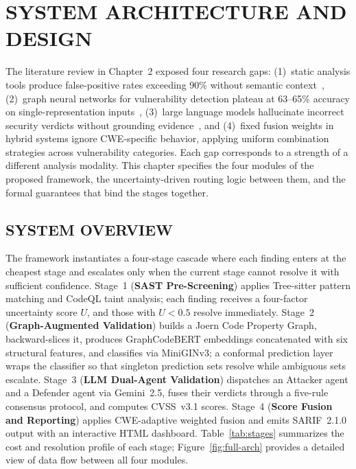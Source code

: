 \chapter{\uppercase{System Architecture and Design}}


The literature review in Chapter~2 exposed four research gaps: (1)~static analysis tools produce false-positive rates exceeding 90\% without semantic context~\cite{ghostsecurity2025}, (2)~graph neural networks for vulnerability detection plateau at 63--65\% accuracy on single-representation inputs~\cite{devign2019}, (3)~large language models hallucinate incorrect security verdicts without grounding evidence~\cite{primevul2024}, and (4)~fixed fusion weights in hybrid systems ignore CWE-specific behavior, applying uniform combination strategies across vulnerability categories. Each gap corresponds to a strength of a different analysis modality. This chapter specifies the four modules of the proposed framework, the uncertainty-driven routing logic between them, and the formal guarantees that bind the stages together.

\section{\uppercase{System Overview}}
\label{sec:system-overview}

The framework instantiates a four-stage cascade where each finding enters at the cheapest stage and escalates only when the current stage cannot resolve it with sufficient confidence. Stage~1 (\textbf{SAST Pre-Screening}) applies Tree-sitter pattern matching and CodeQL taint analysis; each finding receives a four-factor uncertainty score $U$, and those with $U < 0.5$ resolve immediately. Stage~2 (\textbf{Graph-Augmented Validation}) builds a Joern Code Property Graph, backward-slices it, produces GraphCodeBERT embeddings concatenated with six structural features, and classifies via MiniGINv3; a conformal prediction layer wraps the classifier so that singleton prediction sets resolve while ambiguous sets escalate. Stage~3 (\textbf{LLM Dual-Agent Validation}) dispatches an Attacker agent and a Defender agent via Gemini~2.5, fuses their verdicts through a five-rule consensus protocol, and computes CVSS~v3.1 scores. Stage~4 (\textbf{Score Fusion and Reporting}) applies CWE-adaptive weighted fusion and emits SARIF~2.1.0 output with an interactive HTML dashboard. Table~\ref{tab:stages} summarizes the cost and resolution profile of each stage; Figure~\ref{fig:full-arch} provides a detailed view of data flow between all four modules.

